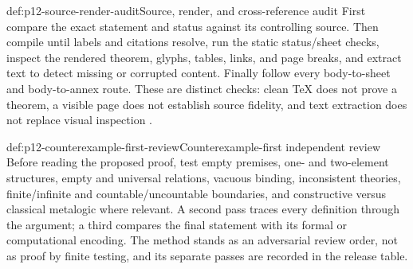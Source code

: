 \begin{hbmethod}{def:p12-source-render-audit}{Source, render, and cross-reference audit}
First compare the exact statement and status against its controlling source.
Then compile until labels and citations resolve, run the static status/sheet
checks, inspect the rendered theorem, glyphs, tables, links, and page breaks,
and extract text to detect missing or corrupted content.  Finally follow every
body-to-sheet and body-to-annex route.  These are distinct checks: clean TeX
does not prove a theorem, a visible page does not establish source fidelity,
and text extraction does not replace visual inspection
\cite{AMSAuthorHandbook,AMSMathGuide,Unicode2025}.
\end{hbmethod}

\begin{hbmethod}{def:p12-counterexample-first-review}{Counterexample-first independent review}
Before reading the proposed proof, test empty premises, one- and two-element
structures, empty and universal relations, vacuous binding, inconsistent
theories, finite/infinite and countable/uncountable boundaries, and constructive
versus classical metalogic where relevant.  A second pass traces every
definition through the argument; a third compares the final statement with its
formal or computational encoding.  The method stands as an adversarial review
order, not as proof by finite testing, and its separate passes are recorded in
the release table.
\end{hbmethod}


